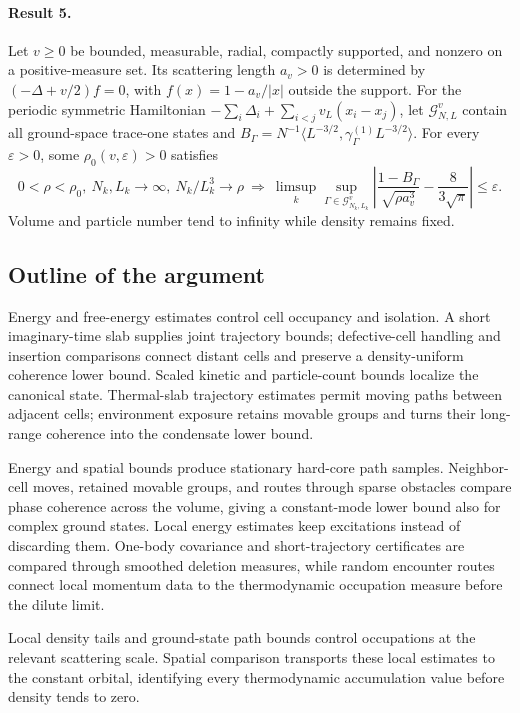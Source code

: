 \documentclass[11pt]{article}
\begin{document}
\paragraph{Result 5.} Let \(v\ge0\) be bounded, measurable, radial, compactly supported, and nonzero on a positive-measure set. Its scattering length \(a_v>0\) is determined by \((-\Delta+v/2)f=0\), with \(f(x)=1-a_v/|x|\) outside the support. For the periodic symmetric Hamiltonian \(-\sum_i\Delta_i+\sum_{i<j}v_L(x_i-x_j)\), let \(\mathcal G^v_{N,L}\) contain all ground-space trace-one states and \(B_\Gamma=N^{-1}\langle L^{-3/2},\gamma^{(1)}_\Gamma L^{-3/2}\rangle\). For every \(\varepsilon>0\), some \(\rho_0(v,\varepsilon)>0\) satisfies
\[
 0<\rho<\rho_0,\ N_k,L_k\to\infty,\ N_k/L_k^3\to\rho
 \ \Longrightarrow\
 \limsup_k\sup_{\Gamma\in\mathcal G^v_{N_k,L_k}}
 \left|\frac{1-B_\Gamma}{\sqrt{\rho a_v^3}}-\frac8{3\sqrt\pi}\right|\le\varepsilon.
\]
Volume and particle number tend to infinity while density remains fixed.

\subsection{Outline of the argument}
Energy and free-energy estimates control cell occupancy and isolation. A short imaginary-time slab supplies joint trajectory bounds; defective-cell handling and insertion comparisons connect distant cells and preserve a density-uniform coherence lower bound. Scaled kinetic and particle-count bounds localize the canonical state. Thermal-slab trajectory estimates permit moving paths between adjacent cells; environment exposure retains movable groups and turns their long-range coherence into the condensate lower bound.

Energy and spatial bounds produce stationary hard-core path samples. Neighbor-cell moves, retained movable groups, and routes through sparse obstacles compare phase coherence across the volume, giving a constant-mode lower bound also for complex ground states. Local energy estimates keep excitations instead of discarding them. One-body covariance and short-trajectory certificates are compared through smoothed deletion measures, while random encounter routes connect local momentum data to the thermodynamic occupation measure before the dilute limit.

Local density tails and ground-state path bounds control occupations at the relevant scattering scale. Spatial comparison transports these local estimates to the constant orbital, identifying every thermodynamic accumulation value before density tends to zero.
\end{document}
